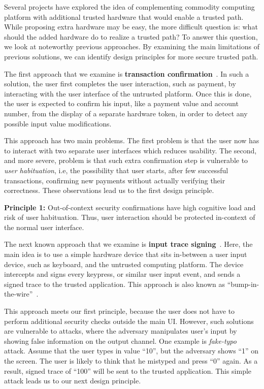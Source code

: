 Several projects have explored the idea of complementing commodity computing platform with additional trusted hardware that would enable a trusted path. While proposing extra hardware may be easy, the more difficult question is: what should the added hardware do to realize a trusted path? To answer this question, we look at noteworthy previous approaches. By examining the main limitations of previous solutions, we can identify design principles for more secure trusted path.
	
The first approach that we examine is \textbf{transaction confirmation}~\cite{filyanov2011uni}. In such a solution, the user first completes the user interaction, such as payment, by interacting with the user interface of the untrusted platform. Once this is done, the user is expected to confirm his input, like a payment value and account number, from the display of a separate hardware token, in order to detect any possible input value modifications.

This approach has two main problems. The first problem is that the user now has to interact with two separate user interfaces which reduces usability. The second, and more severe, problem is that such extra confirmation step is vulnerable to \emph{user habituation}, i.e, the possibility that user starts, after few successful transactions, confirming new payments without actually verifying their correctness. These observations lead us to the first design principle.  

\begin{tcolorbox}
\textbf{Principle 1:} Out-of-context security confirmations have high cognitive load and risk of user habituation. Thus, user interaction should be protected in-context of the normal user interface.
\end{tcolorbox}

The next known approach that we examine is \textbf{input trace signing}~\cite{IntegriKey}. Here, the main idea is to use a simple hardware device that sits in-between a user input device, such as keyboard, and the untrusted computing platform. The device intercepts and signs every keypress, or similar user input event, and sends a signed trace to the trusted application. This approach is also known as ``bump-in-the-wire''~\cite{McCPerRei2006}. 

This approach meets our first principle, because the user does not have to perform additional security checks outside the main UI. However, such solutions are vulnerable to attacks, where the adversary manipulates user's input by showing false information on the output channel. One example is \emph{fake-typo} attack. Assume that the user types in value ``10'', but the adversary shows ``1'' on the screen. The user is likely to think that he mistyped and press ``0'' again. As a result, signed trace of ``100'' will be sent to the trusted application. This simple attack leads us to our next design principle.

